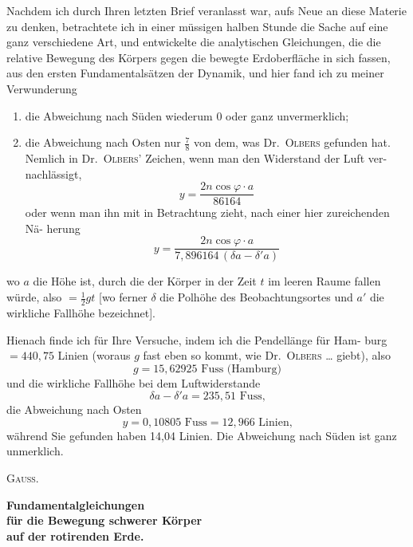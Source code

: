 \documentclass[12pt,a4paper]{article}
\begin{document}
Nachdem ich durch Ihren letzten Brief veranlasst war, aufs Neue an diese 
Materie zu denken, betrachtete ich in einer müssigen halben Stunde die Sache 
auf eine ganz verschiedene Art, und entwickelte die analytischen Gleichungen, 
die die relative Bewegung des Körpers gegen die bewegte Erdoberfläche in sich 
fassen, aus den ersten Fundamentalsätzen der Dynamik, und hier fand ich zu 
meiner Verwunderung

\begin{enumerate}
\item die Abweichung nach Süden wiederum 0 oder ganz unvermerklich;
\item die Abweichung nach Osten nur $\tfrac{7}{8}$ von dem, was Dr.\ \textsc{Olbers} gefunden 
hat. Nemlich in Dr.\ \textsc{Olbers}' Zeichen, wenn man den Widerstand der Luft ver-
nachlässigt,
\[
y = \frac{2n\cos\varphi\cdot a}{86164}
\]
oder wenn man ihn mit in Betrachtung zieht, nach einer hier zureichenden Nä-
herung
\[
y = \frac{2n\cos\varphi\cdot a}{7{,}896164\,(\delta a - \delta' a)}
\]
\end{enumerate}

wo $a$ die Höhe ist, durch die der Körper in der Zeit $t$ im leeren Raume fallen 
würde, also $= \tfrac{1}{2}gt$ [wo ferner $\delta$ die Polhöhe des Beobachtungsortes und $a'$ 
die wirkliche Fallhöhe bezeichnet].

Hienach finde ich für Ihre Versuche, indem ich die Pendellänge für Ham-
burg $= 440{,}75$ Linien (woraus $g$ fast eben so kommt, wie Dr.\ \textsc{Olbers} 
\ldots
giebt), also 
\[
g = 15{,}62925\text{ Fuss (Hamburg)}
\]
und die wirkliche Fallhöhe bei dem Luftwiderstande
\[
\delta a - \delta' a = 235{,}51\text{ Fuss,}
\]
die Abweichung nach Osten 
\[
y = 0{,}10805\text{ Fuss} = 12{,}966\text{ Linien,}
\]
während Sie gefunden haben 14,04 Linien. Die Abweichung nach Süden ist 
ganz unmerklich.

\newpage

\textsc{Gau\ss.}

\begin{center}
\Large\bfseries
Fundamentalgleichungen\\[0.5em]
für die Bewegung schwerer Körper\\[0.5em]
auf der rotirenden Erde.
\end{center}

\medskip
\end{document}
